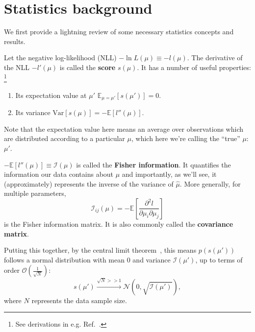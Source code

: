 \section{Statistics background}
\label{sec:pmle_bg}

We first provide a lightning review of some necessary statistics concepts and results.

\begin{definition}
\label{def:score}
Let the negative log-likelihood (NLL) $-\ln L(\mu) \equiv -l(\mu)$.
The derivative of the NLL $-l'(\mu)$ is called the \textbf{score} $s(\mu)$.
It has a number of useful properties:
\footnote{See derivations in e.g. Ref.~\cite{enwiki:1253018821}.}
\begin{enumerate}
  \item Its expectation value at $\mu'$ $\mathbb E_{\mu = \mu'}[s(\mu')] = 0$.
  \item Its variance $\mathrm {Var} [s(\mu)] = - \mathbb E [l''(\mu)]$.
\end{enumerate}
Note that the expectation value here means an average over observations which are distributed according to a particular $\mu$, which here we're calling the ``true'' $\mu$: $\mu'$.
\end{definition}

\begin{definition}
\label{def:fisher_information}
$- \mathbb E [l''(\mu)] \equiv \mathcal I(\mu)$ is called the \textbf{Fisher information}.
It quantifies the information our data contains about $\mu$ and importantly, as we'll see, it (approximately) represents the inverse of the variance of $\hat \mu$.
More generally, for multiple parameters,
\begin{equation}
\label{eq:fisher_matrix}
\mathcal I_{ij}(\mu) = - \mathbb E [\frac{\partial^2 l}{\partial \mu_i \partial \mu_j}]
\end{equation}
is the Fisher information matrix.
It is also commonly called the \textbf{covariance matrix}.
\end{definition}

\begin{theorem}
Putting this together, by the central limit theorem~\cite{enwiki:1257009135}, this means $p(s(\mu'))$ follows a normal distribution with mean $0$ and variance $\mathcal I(\mu')$, up to terms of order $\mathcal O(\frac{1}{\sqrt{N}})$:
\begin{equation}
s(\mu') \xrightarrow{\sqrt{N} >> 1} \mathcal N(0, \sqrt{\mathcal I(\mu')}),
\label{eq:score}
\end{equation}
where $N$ represents the data sample size.
\end{theorem}


